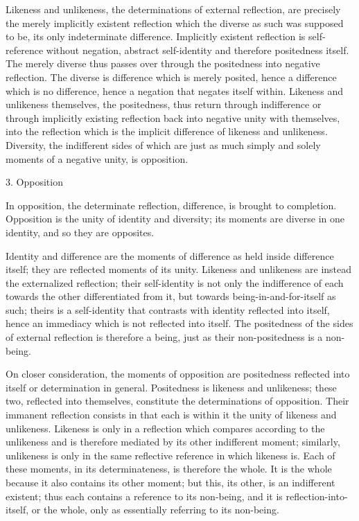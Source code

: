 Likeness and unlikeness,
the determinations of external reflection,
are precisely the merely
implicitly existent reflection
which the diverse as such was supposed to be,
its only indeterminate difference.
Implicitly existent reflection is
self-reference without negation,
abstract self-identity
and therefore positedness itself.
The merely diverse thus passes over
through the positedness
into negative reflection.
The diverse is difference
which is merely posited,
hence a difference which is no difference,
hence a negation that negates itself within.
Likeness and unlikeness themselves, the positedness,
thus return through indifference
or through implicitly existing reflection
back into negative unity with themselves,
into the reflection which is
the implicit difference of likeness and unlikeness.
Diversity, the indifferent sides of which
are just as much simply and solely
moments of a negative unity, is opposition.

3. Opposition

In opposition, the determinate reflection,
difference, is brought to completion.
Opposition is the unity of identity and diversity;
its moments are diverse in one identity,
and so they are opposites.

Identity and difference are the moments of
difference as held inside difference itself;
they are reflected moments of its unity.
Likeness and unlikeness are instead
the externalized reflection;
their self-identity is not only the indifference
of each towards the other differentiated from it,
but towards being-in-and-for-itself as such;
theirs is a self-identity that contrasts with
identity reflected into itself,
hence an immediacy which is not reflected into itself.
The positedness of the sides of
external reflection is therefore a being,
just as their non-positedness is a non-being.

On closer consideration, the moments of opposition are
positedness reflected into itself
or determination in general.
Positedness is likeness and unlikeness;
these two, reflected into themselves,
constitute the determinations of opposition.
Their immanent reflection consists in that
each is within it the unity of likeness and unlikeness.
Likeness is only in a reflection
which compares according to the unlikeness
and is therefore mediated by its
other indifferent moment; similarly,
unlikeness is only in the same
reflective reference in which likeness is.
Each of these moments, in its determinateness,
is therefore the whole.
It is the whole because it also contains its other moment;
but this, its other, is an indifferent existent;
thus each contains a reference to its non-being,
and it is reflection-into-itself, or the whole,
only as essentially referring to its non-being.

